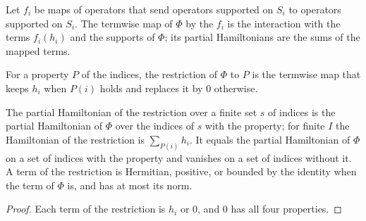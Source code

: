 \begin{definition}
    \label{def:dynamics_interaction_map_term}
    \leanok
    Let $f_i$ be maps of operators that send operators supported on $S_i$ to operators
    supported on $S_i$. The termwise map of $\Phi$ by the $f_i$ is the interaction with the
    terms $f_i(h_i)$ and the supports of $\Phi$; its partial Hamiltonians are the sums of the
    mapped terms.
\end{definition}

\begin{definition}
    \label{def:dynamics_interaction_restrict}
    \leanok
    For a property $P$ of the indices, the restriction of $\Phi$ to $P$ is the termwise map
    that keeps $h_i$ when $P(i)$ holds and replaces it by $0$ otherwise.
\end{definition}

\begin{lemma}
    \label{lem:dynamics_interaction_restrict}
    \leanok
    The partial Hamiltonian of the restriction over a finite set $s$ of indices is the
    partial Hamiltonian of $\Phi$ over the indices of $s$ with the property; for finite $I$
    the Hamiltonian of the restriction is $\sum_{P(i)}h_i$. It equals the partial
    Hamiltonian of $\Phi$ on a set of indices with the property and vanishes on a set of
    indices without it. A term of the restriction is Hermitian, positive, or bounded by the
    identity when the term of $\Phi$ is, and has at most its norm.
\end{lemma}
\begin{proof}\leanok
    Each term of the restriction is $h_i$ or $0$, and $0$ has all four properties.
\end{proof}

